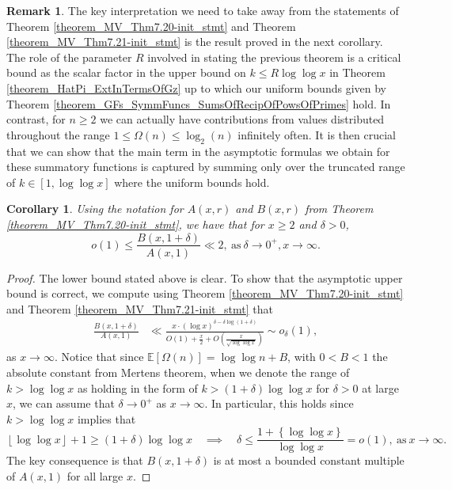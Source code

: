 \documentclass[11pt,reqno,a4letter]{article}
\numberwithin{figure}{section}
\numberwithin{table}{section}
\newcommand{\floor}[1]{\left\lfloor #1 \right\rfloor}
\theoremstyle{plain}
\newtheorem{cor}[theorem]{Corollary}
\numberwithin{theorem}{section}
\theoremstyle{definition}
\newtheorem{remark}[theorem]{Remark}
\begin{document}
\begin{remark} 
The key interpretation we need to take away from the statements 
of Theorem \ref{theorem_MV_Thm7.20-init_stmt} and 
Theorem \ref{theorem_MV_Thm7.21-init_stmt} 
is the result proved in the next corollary. 
The role of the parameter $R$ involved in stating the previous theorem 
is a critical bound as the scalar factor in the upper bound on $k \leq R\log\log x$ in 
Theorem \ref{theorem_HatPi_ExtInTermsOfGz} up to which our uniform bounds given by 
Theorem \ref{theorem_GFs_SymmFuncs_SumsOfRecipOfPowsOfPrimes} hold. 
In contrast, for $n \geq 2$ we can actually 
have contributions from values distributed throughout the range $1 \leq \Omega(n) \leq \log_2(n)$ 
infinitely often. 
It is then crucial that we can show that the main term in the asymptotic formulas we obtain 
for these summatory functions is captured by summing only over the truncated range of 
$k \in [1, \log\log x]$ where the uniform bounds hold. 
\end{remark} 

\begin{cor} 
\label{theorem_MV_Thm7.20} 
Using the notation for $A(x, r)$ and $B(x, r)$ from 
Theorem \ref{theorem_MV_Thm7.20-init_stmt}, 
we have that for $x \geq 2$ and $\delta > 0$, 
\[
o(1) \leq \frac{B(x, 1+\delta)}{A(x, 1)} \ll 2, 
     \mathrm{\ as\ } \delta \rightarrow 0^{+}, x \rightarrow \infty. 
\]
\end{cor} 
\begin{proof} 
The lower bound stated above is clear. To show that the asymptotic 
upper bound is correct, we compute using Theorem \ref{theorem_MV_Thm7.20-init_stmt} and 
Theorem \ref{theorem_MV_Thm7.21-init_stmt} that 
\begin{align*} 
\frac{B(x, 1+\delta)}{A(x, 1)} & \ll 
     \frac{x \cdot (\log x)^{\delta - \delta\log(1+\delta)}}{ 
     O(1) + \frac{x}{2} + 
     O\left(\frac{x}{\sqrt{\log\log x}}\right)} 
     \sim 
     o_{\delta}(1),  
\end{align*} 
as $x \rightarrow \infty$. Notice that since $\mathbb{E}[\Omega(n)] = \log\log n + B$, with $0 < B < 1$ the 
absolute constant from Mertens theorem, 
when we denote the range of $k > \log\log x$ as holding in the form of 
$k > (1 + \delta) \log\log x$ for $\delta > 0$ at large $x$, we can assume that 
$\delta \rightarrow 0^{+}$ as $x \rightarrow \infty$. 
In particular, this holds since $k > \log\log x$ implies that 
\[
\floor{\log\log x} + 1 \geq (1 + \delta) \log\log x \quad\implies\quad 
     \delta \leq \frac{1 + \left\{\log\log x\right\}}{\log\log x} = o(1), 
     \mathrm{\ as\ } x \rightarrow \infty. 
\] 
The key consequence is that $B(x, 1 + \delta)$ is at most a bounded constant multiple of 
$A(x, 1)$ for all large $x$. 
\end{proof} 
\end{document}
